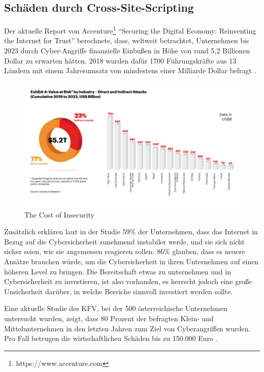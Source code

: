 \subsection{Schäden durch Cross-Site-Scripting}
\label{subsection:damage_from_xss}

Der aktuelle Report von Accenture\footnote{https://www.accenture.com} ``Securing the Digital Economy: Reinventing the Internet for Trust'' berechnete, dass, weltweit betrachtet, Unternehmen bis 2023 durch Cyber-Angriffe finanzielle Einbußen in Höhe von rund 5,2 Billionen Dollar zu erwarten hätten. 2018 wurden dafür 1700 Führungskräfte aus 13 Ländern mit einem Jahresumsatz von mindestens einer Milliarde Dollar befragt \autocite[16]{abbosh2019}.

\begin{figure}[ht]
	\centering
	\includegraphics[width=1\linewidth]{images/Accenture.png}
	\caption[The Cost of Insecurity]
	{The Cost of Insecurity \autocite[17]{abbosh2019}}
\end{figure}

Zusätzlich erklären laut \textcite[17]{abbosh2019} in der Studie 59\% der Unternehmen, dass das Internet in Bezug auf die Cybersicherheit zunehmend instabiler werde, und sie sich nicht sicher seien, wie sie angemessen reagieren sollen. 86\% glauben, dass es neuere Ansätze brauchen würde, um die Cybersicherheit in ihren Unternehmen auf einen höheren Level zu bringen.  Die Bereitschaft etwas zu unternehmen und in Cybersicherheit zu investieren, ist also vorhanden, es herrscht jedoch eine große Unsicherheit darüber, in welche Bereiche sinnvoll investiert werden sollte.

Eine aktuelle Studie des KFV, bei der 500 österreichische Unternehmen untersucht wurden, zeigt, dass 80 Prozent der befragten Klein- und Mittelunternehmen in den letzten Jahren zum Ziel von Cyberangriffen wurden. Pro Fall betrugen die wirtschaftlichen Schäden bis zu 150.000 Euro \autocite{kfv2019}.


